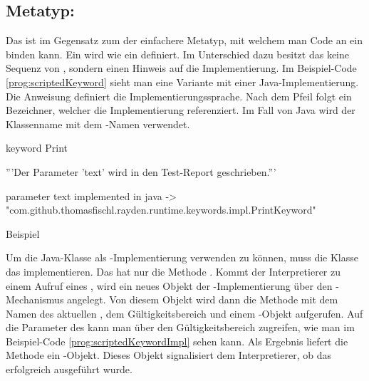 
\subsection{Metatyp: }

Das  ist im Gegensatz zum  der einfachere Metatyp, mit welchem man Code an ein  binden kann. Ein  wird wie ein  definiert. Im Unterschied dazu besitzt das  keine Sequenz von , sondern einen Hinweis auf die Implementierung. Im Beispiel-Code \ref{prog:scriptedKeyword} sieht man eine Variante mit einer Java-Implementierung. Die Anweisung  definiert die Implementierungssprache. Nach dem Pfeil folgt ein Bezeichner, welcher die Implementierung referenziert. Im Fall von Java wird der Klassenname mit dem -Namen verwendet.

\begin{program}
\begin{JavaCode}
keyword Print {
	'''Der Parameter 'text' wird in den Test-Report geschrieben.'''
	
	parameter text
	implemented in java -> "com.github.thomasfischl.rayden.runtime.keywords.impl.PrintKeyword"
}
\end{JavaCode}
\caption{Beispiel }
\label{prog:scriptedKeyword}
\end{program}

\SuperPar
Um die Java-Klasse als -Implementierung verwenden zu können, muss die Klasse das   implementieren. Das  hat nur die Methode . Kommt der Interpretierer zu einem Aufruf eines , wird ein neues Objekt der -Implementierung über den -Mechanismus angelegt. Von diesem Objekt wird dann die Methode  mit dem Namen des aktuellen , dem Gültigkeitsbereich und einem -Objekt aufgerufen. Auf die Parameter des  kann man über den Gültigkeitsbereich zugreifen, wie man im Beispiel-Code \ref{prog:scriptedKeywordImpl} sehen kann. Als Ergebnis liefert die Methode ein -Objekt. Dieses Objekt signalisiert dem Interpretierer, ob das  erfolgreich ausgeführt wurde.   

